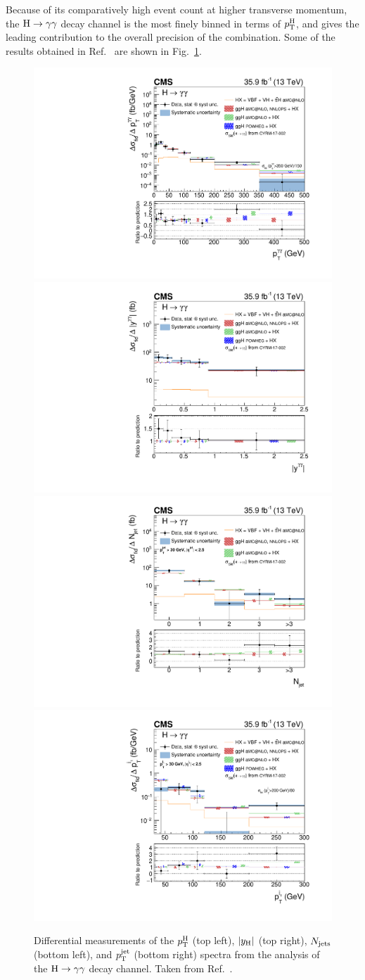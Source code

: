 Because of its comparatively high event count at higher transverse momentum, the $\mathrm{H}\to\mathrm{\gamma}\mathrm{\gamma}$ decay channel is the most finely binned in terms of $p_\mathrm{T}^\mathrm{H}$, and gives the leading contribution to the overall precision of the combination.
% 
Some of the results obtained in Ref.~\cite{Sirunyan:2018kta} are shown in Fig.~\ref{fig:hgg-results}.


\begin{figure}[hbtp]
  \begin{center}
    \includegraphics[width=0.49\linewidth]{img/inputs/hgg/pth.pdf}
    \includegraphics[width=0.49\linewidth]{img/inputs/hgg/absy.pdf}
    \\
    \includegraphics[width=0.49\linewidth]{img/inputs/hgg/njets.pdf}
    \includegraphics[width=0.49\linewidth]{img/inputs/hgg/ptjet.pdf}
    \caption{
        Differential measurements of the $p_\mathrm{T}^\mathrm{H}$ (top left), $\left|y_\mathrm{H}\right| $ (top right), $N_\text{jets} $ (bottom left), and $p_\mathrm{T}^\text{jet} $ (bottom right) spectra from the analysis of the $\mathrm{H}\to\mathrm{\gamma}\mathrm{\gamma}$ decay channel.
        Taken from Ref.~\cite{Sirunyan:2018kta}.
        }
    \label{fig:hgg-results}
  \end{center}
\end{figure}



